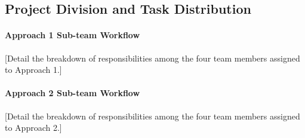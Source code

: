 \subsection{Project Division and Task Distribution}

\paragraph{Approach 1 Sub-team Workflow}
[Detail the breakdown of responsibilities among the four team members assigned to Approach 1.]

\paragraph{Approach 2 Sub-team Workflow}
[Detail the breakdown of responsibilities among the four team members assigned to Approach 2.]
